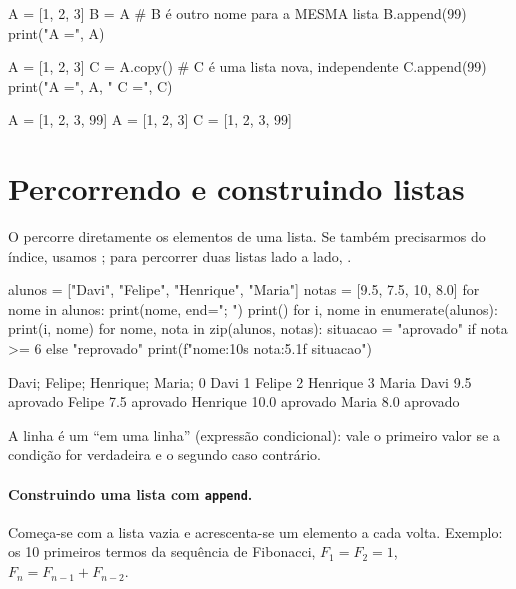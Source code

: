 \begin{entrada}
A = [1, 2, 3]
B = A             # B é outro nome para a MESMA lista
B.append(99)
print("A =", A)

A = [1, 2, 3]
C = A.copy()      # C é uma lista nova, independente
C.append(99)
print("A =", A, "  C =", C)
\end{entrada}
\begin{saida}
A = [1, 2, 3, 99]
A = [1, 2, 3]   C = [1, 2, 3, 99]
\end{saida}

\section{Percorrendo e construindo listas}

O  percorre diretamente os elementos de uma lista. Se também precisarmos do índice, usamos
; para percorrer duas listas lado a lado, .

\begin{entrada}
alunos = ["Davi", "Felipe", "Henrique", "Maria"]
notas = [9.5, 7.5, 10, 8.0]
for nome in alunos:
    print(nome, end="; ")
print()
for i, nome in enumerate(alunos):
    print(i, nome)
for nome, nota in zip(alunos, notas):
    situacao = "aprovado" if nota >= 6 else "reprovado"
    print(f"{nome:10s} {nota:5.1f}  {situacao}")
\end{entrada}
\begin{saida}
Davi; Felipe; Henrique; Maria;
0 Davi
1 Felipe
2 Henrique
3 Maria
Davi         9.5  aprovado
Felipe       7.5  aprovado
Henrique    10.0  aprovado
Maria        8.0  aprovado
\end{saida}

\begin{observacao}
A linha  é um  ``em uma linha'' (expressão
condicional): vale o primeiro valor se a condição for verdadeira e o segundo caso contrário.
\end{observacao}

\paragraph{Construindo uma lista com \texttt{append}.} Começa-se com a lista vazia e acrescenta-se um elemento a
cada volta. Exemplo: os 10 primeiros termos da sequência de Fibonacci, $F_1=F_2=1$, $F_{n}=F_{n-1}+F_{n-2}$.

